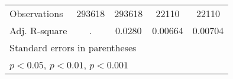\begin{table}[htbp]
{\begin{tabular}{l*{4}{c}}
            Observations           & 293618                         & 293618                         & 22110                     & 22110                     \\
            Adj. R-square          & .                              & 0.0280                         & 0.00664                   & 0.00704                   \\
            \bottomrule
            \multicolumn{5}{l}{\footnotesize Standard errors in parentheses}                                                                                 \\
            \multicolumn{5}{l}{\footnotesize \sym{*} \(p<0.05\), \sym{**} \(p<0.01\), \sym{***} \(p<0.001\)}                                                 \\
        \end{tabular}}
\end{table}
